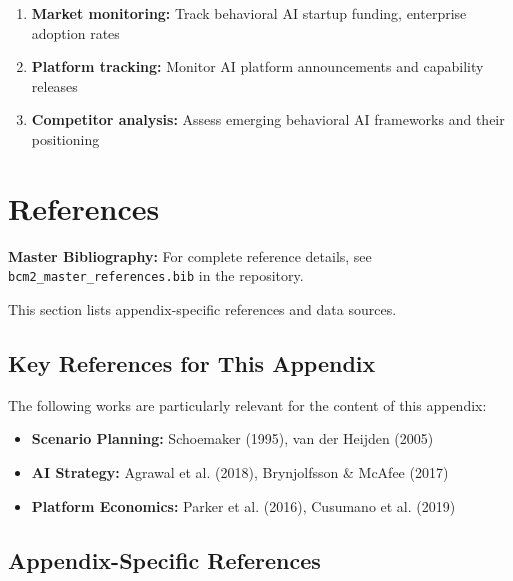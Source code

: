 \begin{enumerate}
    \item \textbf{Market monitoring:} Track behavioral AI startup funding,
        enterprise adoption rates
    \item \textbf{Platform tracking:} Monitor AI platform announcements and
        capability releases
    \item \textbf{Competitor analysis:} Assess emerging behavioral AI
        frameworks and their positioning
\end{enumerate}


\section{References}

\nocite{bcm_master}

\label{sec:vvv1-references}

\begin{tcolorbox}[colback=blue!5!white, colframe=blue!75!black]
\textbf{Master Bibliography:} For complete reference details, see
\texttt{bcm2\_master\_references.bib} in the repository.

This section lists appendix-specific references and data sources.
\end{tcolorbox}

\vspace{0.5em}

\subsection{Key References for This Appendix}

The following works are particularly relevant for the content of this appendix:

\begin{itemize}[nosep]
    \item \textbf{Scenario Planning:} Schoemaker (1995), van der Heijden (2005)
    \item \textbf{AI Strategy:} Agrawal et al. (2018), Brynjolfsson \& McAfee (2017)
    \item \textbf{Platform Economics:} Parker et al. (2016), Cusumano et al. (2019)
\end{itemize}

\subsection{Appendix-Specific References}

